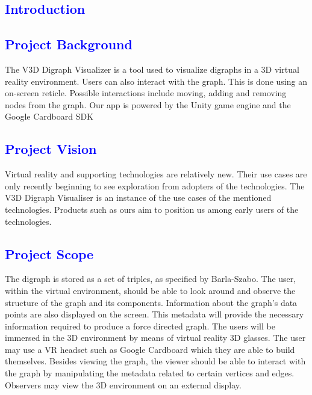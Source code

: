\documentclass[12pt]{article}
\begin{document}
\newpage
{}
\thispagestyle{empty}
\tableofcontents
\clearpage

\textcolor{blue}{\section{Introduction}}
\textcolor{blue}{\subsection{Project Background}}
\begin{flushleft}
The V3D Digraph Visualizer is a tool used to visualize digraphs in a 3D virtual reality environment. Users can also interact with the graph. This is done using an on-screen reticle. Possible interactions include moving, adding and removing nodes from the graph. Our app is powered by the Unity game engine and the Google Cardboard SDK
\end{flushleft}

\textcolor{blue}{\subsection{Project Vision}}
\begin{flushleft}
Virtual reality and supporting technologies are relatively new. Their use cases are only recently beginning to see exploration from adopters of the technologies. The V3D Digraph Visualiser is an instance of the use cases of the mentioned technologies. Products such as ours aim to position us among early users of the technologies.
\end{flushleft}

\textcolor{blue}{\subsection{Project Scope}}
\begin{flushleft}
The digraph is stored as a set of triples, as specified by Barla-Szabo. The user, within the virtual environment, should be able to look around and observe the structure of the graph and its components. Information about the graph's data points are also displayed on the screen. This metadata will provide the necessary information required to produce a force directed graph. The users will be immersed in the 3D environment by means of virtual reality 3D glasses. The user may use a VR headset such as Google Cardboard which they are able to build themselves. Besides viewing the graph, the viewer should be able to interact with the graph by manipulating the metadata related to certain vertices and edges. Observers may view the 3D environment on an external display.
\end{flushleft}
\end{document}
